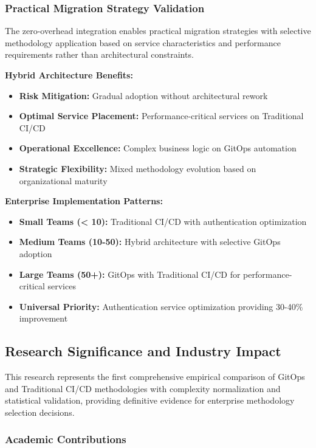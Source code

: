 \subsubsection{Practical Migration Strategy Validation}

The zero-overhead integration enables practical migration strategies with selective methodology application based on service characteristics and performance requirements rather than architectural constraints.

\textbf{Hybrid Architecture Benefits:}
\begin{itemize}
\item \textbf{Risk Mitigation:} Gradual adoption without architectural rework
\item \textbf{Optimal Service Placement:} Performance-critical services on Traditional CI/CD
\item \textbf{Operational Excellence:} Complex business logic on GitOps automation
\item \textbf{Strategic Flexibility:} Mixed methodology evolution based on organizational maturity
\end{itemize}

\textbf{Enterprise Implementation Patterns:}
\begin{itemize}
\item \textbf{Small Teams (< 10):} Traditional CI/CD with authentication optimization
\item \textbf{Medium Teams (10-50):} Hybrid architecture with selective GitOps adoption
\item \textbf{Large Teams (50+):} GitOps with Traditional CI/CD for performance-critical services
\item \textbf{Universal Priority:} Authentication service optimization providing 30-40\% improvement
\end{itemize}

\subsection{Research Significance and Industry Impact}
\label{subsec:research_significance}

This research represents the first comprehensive empirical comparison of GitOps and Traditional CI/CD methodologies with complexity normalization and statistical validation, providing definitive evidence for enterprise methodology selection decisions.

\subsubsection{Academic Contributions}

